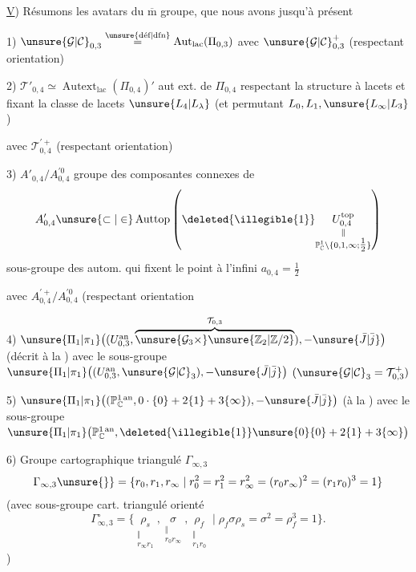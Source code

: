 \uline{V}) Résumons les avatars du $\overline{\mathrm m}$ groupe, que nous avons
 jusqu'à présent

1) $\unsure{\mathcal{G}|\mathcal{C}}_{0,3}\overset{\unsure{\text{déf}|\text{dfn}}}{=}\operatorname{Aut}_{\mathrm{lac}}(\Pi_{0,3})$
avec  $\unsure{\mathcal{G}|\mathcal{C}}_{0,3}^{+}$ (respectant orientation)

2) $\mathcal{T}'_{0,4}\simeq\operatorname{Autext}_{\mathrm{lac}}(\Pi_{0,4})'$
aut ext. de $\Pi_{0,4}$ respectant la structure à lacets et fixant la classe de lacets
$\unsure{L_4|L_\lambda}$ (et permutant $L_0,L_1,\unsure{L_\infty|L_3}$)

avec $\mathcal{T}_{0,4}^{\prime+}$ (respectant orientation)

3) $A'_{0,4}/A_{0,4}^{\prime0}$ groupe des composantes connexes de
\[
A'_{0,4}\unsure{\subset|\in}\operatorname{Auttop}
\left(\deleted{\illegible{1}}
\underset{\substack{\Vert\\\mathbb P^1_{\mathbb C}\setminus\{0,1,\infty;\tfrac12\}}}{U_{0,4}^{\mathrm{top}}}\right)
\]
sous-groupe des autom. qui fixent le point à l'infini $a_{0,4}=\tfrac12$

avec $A_{0,4}^{\prime+}/A_{0,4}^{\prime0}$ (respectant orientation

4) $\unsure{\Pi_1|\pi_1}\bigl((U_{0,3}^{\mathrm{an}},\overbrace{\unsure{\mathcal{G}_3\times}\unsure{\mathbb Z_2|\mathbb Z/2}}^{\mathcal{T}_{0,3}}),-\unsure{\bar J|\bar j}\bigr)$
(décrit à la )
avec le sous-groupe $\unsure{\Pi_1|\pi_1}\bigl((U_{0,3}^{\mathrm{an}},\unsure{\mathcal{G}|\mathcal{C}}_3),-\unsure{\bar J|\bar j}\bigr)$
$(\unsure{\mathcal{G}|\mathcal{C}}_3=\mathcal{T}_{0,3}^{+})$

5) $\unsure{\Pi_1|\pi_1}\bigl((\mathbb P^{1\,\mathrm{an}}_{\mathbb C},0\cdot\{0\}+2\{1\}+3\{\infty\}),-\unsure{\bar J|\bar j}\bigr)$
(à la )
avec le sous-groupe $\unsure{\Pi_1|\pi_1}\bigl(\mathbb P^{1\,\mathrm{an}}_{\mathbb C},\deleted{\illegible{1}}\unsure{0}\{0\}+2\{1\}+3\{\infty\}\bigr)$

6) Groupe cartographique triangulé  $\Gamma_{\infty,3}$
\[
\Gamma_{\infty,3}\unsure{\}}=\{r_0,r_1,r_\infty\mid
r_0^2=r_1^2=r_\infty^2=(r_0r_\infty)^2=(r_1r_0)^3=1\}
\]
(avec sous-groupe cart. triangulé orienté
\[
\Gamma_{\infty,3}^{\circ}=\{
\underset{\substack{\Vert\\r_\infty r_1}}{\rho_s},
\underset{\substack{\Vert\\r_0r_\infty}}{\sigma},
\underset{\substack{\Vert\\r_1r_0}}{\rho_f}
\mid\rho_f\sigma\rho_s=\sigma^2=\rho_f^3=1\}.
\]
)

